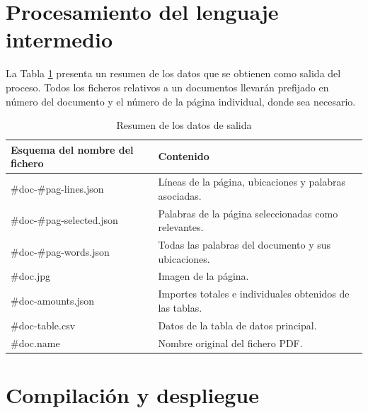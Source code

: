\section{Procesamiento del lenguaje intermedio}

La Tabla \ref{tab:datos-de-salida} presenta un resumen de los datos que se obtienen como salida del proceso. Todos los ficheros relativos a un documentos llevarán prefijado en número del documento y el número de la página individual, donde sea necesario.

\begin{table}[ht]
    \centering
    \begin{tabular}{l l}
        Esquema del nombre del fichero & Contenido \\
        \hline
        \hline
        \#doc-\#pag-lines.json & Líneas de la página, ubicaciones y palabras asociadas. \\
        \#doc-\#pag-selected.json & Palabras de la página seleccionadas como relevantes. \\
        \#doc-\#pag-words.json & Todas las palabras del documento y sus ubicaciones. \\
        \#doc.jpg & Imagen de la página. \\
        \#doc-amounts.json & Importes totales e individuales obtenidos de las tablas. \\
        \#doc-table.csv & Datos de la tabla de datos principal. \\
        \#doc.name & Nombre original del fichero PDF.\\
    \end{tabular}
    \caption{Resumen de los datos de salida}    
    \label{tab:datos-de-salida}
\end{table}

\section{Compilación y despliegue}


